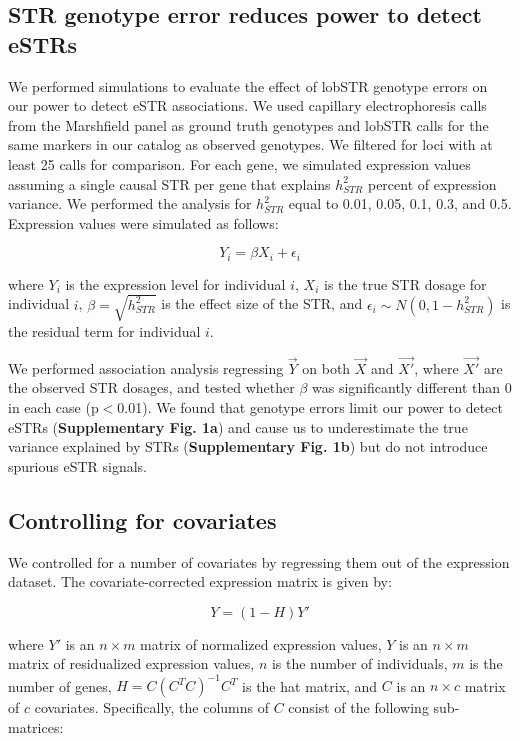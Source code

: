 \subsection{STR genotype error reduces power to detect eSTRs}

We performed simulations to evaluate the effect of lobSTR genotype errors on our power to detect eSTR associations. We used capillary electrophoresis calls from the Marshfield panel as ground truth genotypes and lobSTR calls for the same markers in our catalog as observed genotypes. We filtered for loci with at least 25 calls for comparison. For each gene, we simulated expression values assuming a single causal STR per gene that explains $h^2_{STR}$ percent of expression variance. We performed the analysis for $h^2_{STR}$ equal to 0.01, 0.05, 0.1, 0.3, and 0.5. Expression values were simulated as follows:

\begin{equation}
Y_i = \beta X_i + \epsilon_i
\end{equation}

where $Y_i$ is the expression level for individual $i$, $X_i$ is the true STR dosage for individual $i$, $\beta=\sqrt{h^2_{STR} }$ is the effect size of the STR, and $\epsilon_i \sim N(0, 1-h^2_{STR})$ is the residual term for individual $i$.

We performed association analysis regressing $\vec{Y}$ on both $\vec{X}$ and $\vec{X'}$, where $\vec{X'}$ are the observed STR dosages, and tested whether $\beta$ was significantly different than 0 in each case (p$<$0.01). We found that genotype errors limit our power to detect eSTRs (\textbf{Supplementary Fig. 1a}) and cause us to underestimate the true variance explained by STRs (\textbf{Supplementary Fig. 1b}) but do not introduce spurious eSTR signals.

\subsection{Controlling for covariates}
We controlled for a number of covariates by regressing them out of the
expression dataset. The covariate-corrected expression matrix is given
by:

\begin{equation}
Y = (1-H)Y'
\end{equation}

where $Y'$ is an $n \times m$ matrix of normalized expression values,
$Y$ is an $n \times m$ matrix of residualized expression values, $n$ is
the number of individuals, $m$ is the number of genes,
$H=C(C^TC)^{-1}C^T$ is the hat matrix, and $C$ is an $n \times c$ matrix
of $c$ covariates. Specifically, the columns of $C$ consist of the
following sub-matrices:


